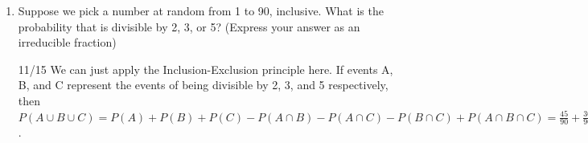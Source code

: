 \documentclass[11pt, preview]{standalone} %
\begin{document}
\begin{enumerate}
\item Suppose we pick a number at random from 1 to 90, inclusive. What is the probability that is divisible by 2, 3, or 5? (Express your answer as an irreducible fraction)
\begin{Freeform}{11/15}
\Solution We can just apply the Inclusion-Exclusion principle here. If events A, B, and C represent the events of being
divisible by 2, 3, and 5 respectively, then
$P(A \cup B \cup C) = P(A) + P(B) + P(C) - P(A \cap B) - P(A \cap C) - P(B \cap C) + P(A \cap B \cap C) = \frac{45}{90} + \frac{30}{90} + \frac{18}{90} - \frac{15}{90} - \frac{9}{90} - \frac{6}{90} + \frac{3}{90} = \frac{66}{90}$.
\end{Freeform}


\end{enumerate}
\end{document}
